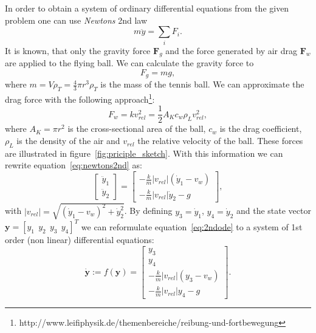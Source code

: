 \documentclass[11pt,a4paper,oneside]{scrartcl}
\begin{document}
In order to obtain a system of ordinary differential equations from the given problem one can use \textit{Newtons} 2nd law
\begin{equation}
m\ddot{y} = \sum\limits_i F_i .
\label{eq:newtons2nd}
\end{equation}
It is known, that only the gravity force $\boldsymbol{F}_g$ and the force generated by air drag $\boldsymbol{F}_w$ are applied to the flying ball. 
We can calculate the gravity force to
\begin{equation}
F_g = mg,
\end{equation}
where $m = V \rho_T = \frac{4}{3}\pi r^3 \rho_T $ is the mass of the tennis ball.
We can approximate the drag force with the following approach\footnote{http://www.leifiphysik.de/themenbereiche/reibung-und-fortbewegung}:
\begin{equation}
F_w = k v_{rel}^2 = \frac{1}{2} A_K c_w \rho_L v_{rel}^2,
\label{eq:drag force}
\end{equation}
where $A_K = \pi r^2$ is the cross-sectional area of the ball, $c_w$ is the drag coefficient, $\rho_L$ is the density of the air and $v_{rel}$ the relative velocity of the ball. These forces are illustrated in figure~\ref{fig:priciple_sketch}. With this information we can rewrite equation~\ref{eq:newtons2nd} as:
\begin{equation}
\begin{bmatrix}
\ddot{y}_1 \\ \ddot{y}_2
\end{bmatrix}
= 
\begin{bmatrix}
-\frac{k}{m}\big|v_{rel}\big|\left(\dot{y}_1 -  v_w\right)\\
-\frac{k}{m}|v_{rel}|\dot{y}_2 - g
\end{bmatrix},
\label{eq:2ndode}
\end{equation}
with $|v_{rel}| = \sqrt{\left( \dot{y}_1 -v_w \right)^2 + \dot{y}_2^2}$. 
By defining $y_3 = \dot{y}_1$, $y_4 = \dot{y}_2$ and the state vector $\boldsymbol{y} = [y_1~~ y_2~~ y_3~~ y_4]^T$ we can reformulate equation~\ref{eq:2ndode} to a system of 1st order (non linear) differential equations:
\begin{equation}
\dot{\boldsymbol{y}}
:=  f(\boldsymbol{y}) = 
\begin{bmatrix}
y_3 \\ y_4 \\
-\frac{k}{m}|v_{rel}|\left(y_3-v_w\right)\\
-\frac{k}{m}|v_{rel}|{y_4} - g
\end{bmatrix}.
\label{eq:1stode}
\end{equation}
\end{document}
